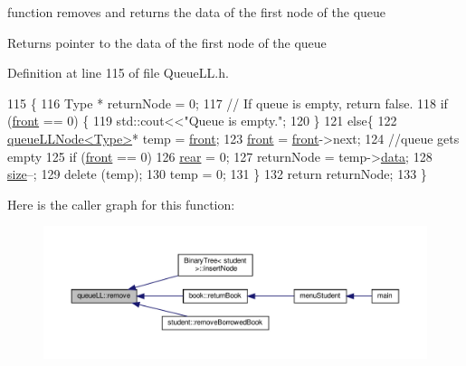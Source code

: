 function removes and returns the data of the first node of the queue \begin{DoxyReturn}{Returns}
pointer to the data of the first node of the queue 
\end{DoxyReturn}


Definition at line 115 of file Queue\+L\+L.\+h.


\begin{DoxyCode}
115                     \{
116         Type * returnNode = 0;
117         \textcolor{comment}{// If queue is empty, return false.}
118         \textcolor{keywordflow}{if} (\hyperlink{classqueue_l_l_a622ea439d113fe8e4616320ec2346d8b}{front} == 0) \{
119             std::cout<<\textcolor{stringliteral}{"Queue is empty."};
120         \}
121         \textcolor{keywordflow}{else}\{
122             \hyperlink{classqueue_l_l_node}{queueLLNode<Type>}* temp = \hyperlink{classqueue_l_l_a622ea439d113fe8e4616320ec2346d8b}{front};
123             \hyperlink{classqueue_l_l_a622ea439d113fe8e4616320ec2346d8b}{front} = \hyperlink{classqueue_l_l_a622ea439d113fe8e4616320ec2346d8b}{front}->next;
124             \textcolor{comment}{//queue gets empty}
125             \textcolor{keywordflow}{if} (\hyperlink{classqueue_l_l_a622ea439d113fe8e4616320ec2346d8b}{front} == 0)
126                 \hyperlink{classqueue_l_l_aab0540567095f05fb1c981a2e7e4e93e}{rear} = 0;
127             returnNode = temp->\hyperlink{classqueue_l_l_node_a20b1170d8c5852b7dc01e56fda4e4206}{data};
128             \hyperlink{classqueue_l_l_af2ae538d6971624f1c8404d3a8502aa0}{size}--;
129             \textcolor{keyword}{delete} (temp);
130             temp = 0;
131         \}
132         \textcolor{keywordflow}{return} returnNode;
133     \}
\end{DoxyCode}
Here is the caller graph for this function\+:
\nopagebreak
\begin{figure}[H]
\begin{center}
\leavevmode
\includegraphics[width=350pt]{classqueue_l_l_a4204a9db973b69be5824ca2495130b40_icgraph}
\end{center}
\end{figure}
\mbox{\label{classqueue_l_l_abe3f175ee8c25c55d18650c5b13297b1}} 
